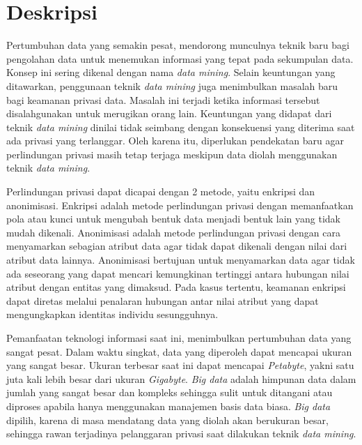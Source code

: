 \documentclass[a4paper,twoside]{article}
\begin{document}
\title{\@judultopik}
\author{\nama \textendash \@npm} 

\newcommand{\nama}{Stephen Jordan}
\newcommand{\@npm}{2016730018}
\newcommand{\@judultopik}{Penerapan Algoritma Anonimisasi Data pada
Lingkungan Big Data} %
\newcommand{\jumpemb}{1} %
\newcommand{\tanggal}{03/02/2020}


\maketitle


\section{Deskripsi}

Pertumbuhan data yang semakin pesat, mendorong munculnya teknik baru bagi pengolahan data untuk menemukan informasi yang tepat pada sekumpulan data. Konsep ini sering dikenal dengan nama {\it data mining}. Selain keuntungan yang ditawarkan, penggunaan teknik {\it data mining} juga menimbulkan masalah baru bagi keamanan privasi data. Masalah ini terjadi ketika informasi tersebut disalahgunakan untuk merugikan orang lain. Keuntungan yang didapat dari teknik {\it data mining} dinilai tidak seimbang dengan konsekuensi yang diterima saat ada privasi yang terlanggar. Oleh karena itu, diperlukan pendekatan baru agar perlindungan privasi masih tetap terjaga meskipun data diolah menggunakan teknik {\it data mining}.

Perlindungan privasi dapat dicapai dengan 2 metode, yaitu enkripsi dan anonimisasi. Enkripsi adalah metode perlindungan privasi dengan memanfaatkan pola atau kunci untuk mengubah bentuk  data menjadi bentuk lain yang tidak mudah dikenali. Anonimisasi adalah metode perlindungan privasi dengan cara menyamarkan sebagian atribut data agar tidak dapat dikenali dengan nilai dari atribut data lainnya. Anonimisasi bertujuan untuk menyamarkan data agar tidak ada seseorang yang dapat mencari kemungkinan tertinggi antara hubungan nilai atribut dengan entitas yang dimaksud. Pada kasus tertentu, keamanan enkripsi dapat diretas melalui penalaran hubungan antar nilai atribut yang dapat mengungkapkan identitas individu sesungguhnya. 

Pemanfaatan teknologi informasi saat ini, menimbulkan pertumbuhan data yang sangat pesat. Dalam waktu singkat, data yang diperoleh dapat mencapai ukuran yang sangat besar. Ukuran terbesar saat ini dapat mencapai {\it Petabyte}, yakni satu juta kali lebih besar dari ukuran {\it Gigabyte}. {\it Big data} adalah himpunan data dalam jumlah yang sangat besar dan kompleks sehingga sulit untuk ditangani atau diproses apabila hanya menggunakan manajemen basis data biasa. {\it Big data} dipilih, karena di masa mendatang data yang diolah akan berukuran besar, sehingga rawan terjadinya pelanggaran privasi saat dilakukan teknik {\it data mining}. 
\end{document}
